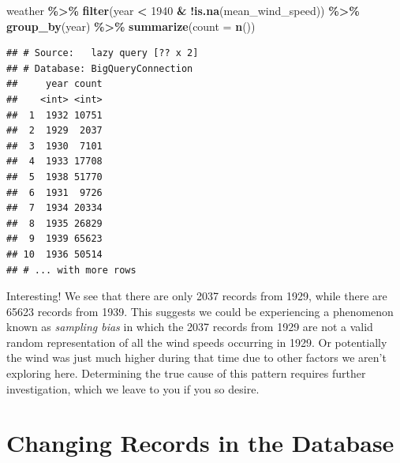 \documentclass[
]{krantz}
\newenvironment{Shaded}{\begin{snugshade}}{\end{snugshade}}
\newcommand{\DataTypeTok}[1]{\textcolor[rgb]{0.13,0.29,0.53}{#1}}
\newcommand{\DecValTok}[1]{\textcolor[rgb]{0.00,0.00,0.81}{#1}}
\newcommand{\KeywordTok}[1]{\textcolor[rgb]{0.13,0.29,0.53}{\textbf{#1}}}
\newcommand{\NormalTok}[1]{#1}
\newcommand{\OperatorTok}[1]{\textcolor[rgb]{0.81,0.36,0.00}{\textbf{#1}}}
\newcommand{\StringTok}[1]{\textcolor[rgb]{0.31,0.60,0.02}{#1}}
\begin{document}
\begin{Shaded}
\begin{Highlighting}[]
\NormalTok{weather }\OperatorTok{\%\textgreater{}\%}
\StringTok{  }\KeywordTok{filter}\NormalTok{(year }\OperatorTok{\textless{}}\StringTok{ }\DecValTok{1940} \OperatorTok{\&}\StringTok{ }\OperatorTok{!}\KeywordTok{is.na}\NormalTok{(mean\_wind\_speed)) }\OperatorTok{\%\textgreater{}\%}
\StringTok{  }\KeywordTok{group\_by}\NormalTok{(year) }\OperatorTok{\%\textgreater{}\%}
\StringTok{  }\KeywordTok{summarize}\NormalTok{(}\DataTypeTok{count =} \KeywordTok{n}\NormalTok{())}
\end{Highlighting}
\end{Shaded}

\begin{verbatim}
## # Source:   lazy query [?? x 2]
## # Database: BigQueryConnection
##     year count
##    <int> <int>
##  1  1932 10751
##  2  1929  2037
##  3  1930  7101
##  4  1933 17708
##  5  1938 51770
##  6  1931  9726
##  7  1934 20334
##  8  1935 26829
##  9  1939 65623
## 10  1936 50514
## # ... with more rows
\end{verbatim}

Interesting! We see that there are only 2037 records from 1929, while there are 65623 records from 1939. This suggests we could be experiencing a phenomenon known as \emph{sampling bias} in which the 2037 records from 1929 are not a valid random representation of all the wind speeds occurring in 1929. Or potentially the wind was just much higher during that time due to other factors we aren't exploring here. Determining the true cause of this pattern requires further investigation, which we leave to you if you so desire.

\hypertarget{changing-records-in-the-database}{%
\section{Changing Records in the Database}\label{changing-records-in-the-database}}
\end{document}
